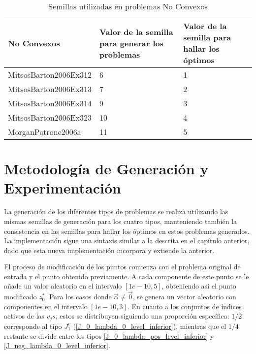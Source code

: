     \begin{table}[h!]
        \centering
        \caption{Semillas utilizadas en problemas No Convexos}
        \begin{adjustbox}{max width=\textwidth}
        \begin{tabular}{ | m{5cm} | m{5cm} | m{5cm} | }
          
          \hline
          \textbf{No Convexos} & \textbf{Valor de la semilla para generar los problemas}  & \textbf{Valor de la semilla para hallar los óptimos} \\
          \hline
          MitsosBarton2006Ex312 & 6  & 1\\
          \hline
          MitsosBarton2006Ex313 & 7 & 2 \\
          \hline
          MitsosBarton2006Ex314 & 9 & 3\\
          \hline
          MitsosBarton2006Ex323 & 10 & 4\\
          \hline
          MorganPatrone2006a & 11 & 5 \\
          \hline
        \end{tabular}
     \end{adjustbox}
    \end{table}

    \section{Metodología de Generación y Experimentación}

    La generación de los diferentes tipos de problemas se realiza utilizando las mismas semillas de generación para los cuatro tipos, manteniendo también la consistencia en las semillas para hallar los óptimos en estos problemas generados. La implementación sigue una sintaxis similar a la descrita en el capítulo anterior, dado que esta nueva implementación incorpora y extiende la anterior.
    
    El proceso de modificación de los puntos comienza con el problema original de entrada y el punto obtenido previamente. A cada componente de este punto se le añade un valor aleatorio en el intervalo $[1e-10, 5]$, obteniendo así el punto modificado $z^*_0$. Para los casos donde $\vec{\alpha}\neq \vec{0}$, se genera un vector aleatorio con componentes en el intervalo $[1e-10, 3]$. En cuanto a los conjuntos de índices activos de las $v_{j}s$, estos se distribuyen siguiendo una proporción específica: $1/2$ corresponde al tipo $J_1^v$ (\ref{J_0_lambda_0_level_inferior}), mientras que el $1/4$ restante se divide entre los tipos \ref{J_0_lambda_pos_level_inferior} y \ref{J_neg_lambda_0_level_inferior}.
    
